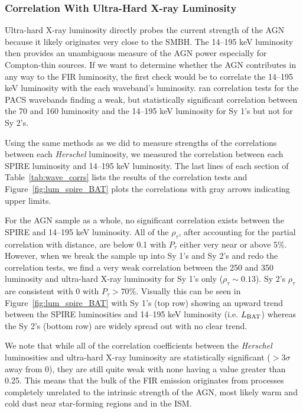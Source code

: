 \subsubsection{Correlation With Ultra-Hard X-ray Luminosity}
Ultra-hard X-ray luminosity directly probes the current strength of the AGN because it likely originates very close to the SMBH. The 14--195 keV luminosity then provides an unambiguous measure of the AGN power especially for Compton-thin sources. If we want to determine whether the AGN contributes in any way to the FIR luminosity, the first check would be to correlate the 14--195 keV luminosity with the each waveband's luminosity. \citet{Melendez:2014yu} ran correlation tests for the PACS wavebands finding a weak, but statistically significant correlation between the 70 and 160 \um{} luminosity and the 14--195 keV luminosity for Sy 1's but not for Sy 2's.

Using the same methods as we did to measure strengths of the correlations between each \textit{Herschel} luminosity, we measured the correlation between each SPIRE luminosity and 14--195 keV luminosity. The last lines of each section of Table~\ref{tab:wave_corrs} lists the results of the correlation tests and Figure~\ref{fig:lum_spire_BAT} plots the correlations with gray arrows indicating upper limits.

For the AGN sample as a whole, no significant correlation exists between the SPIRE and 14--195 keV luminosity. All of the $\rho_{\tau}$, after accounting for the partial correlation with distance, are below 0.1 with $P_{\tau}$ either very near or above 5\%. However, when we break the sample up into Sy 1's and Sy 2's and redo the correlation tests, we find a very weak correlation between the 250 and 350 \um{} luminosity and ultra-hard X-ray luminosity for Sy 1's only ($\rho_{\tau}\sim0.13$). Sy 2's $\rho_{\tau}$ are consistent with 0 with $P_{\tau}>70\%$. Visually this can be seen in Figure~\ref{fig:lum_spire_BAT} with Sy 1's (top row) showing an upward trend between the SPIRE luminosities and 14--195 keV luminosity (i.e. $L_{\rm BAT}$) whereas the Sy 2's (bottom row) are widely spread out with no clear trend.

We note that while all of the correlation coefficients between the \textit{Herschel} luminosities and ultra-hard X-ray luminosity are statistically significant ($>3\sigma$ away from 0), they are still quite weak with none having a value greater than 0.25. This means that the bulk of the FIR emission originates from processes completely unrelated to the intrinsic strength of the AGN, most likely warm and cold dust near star-forming regions and in the ISM.